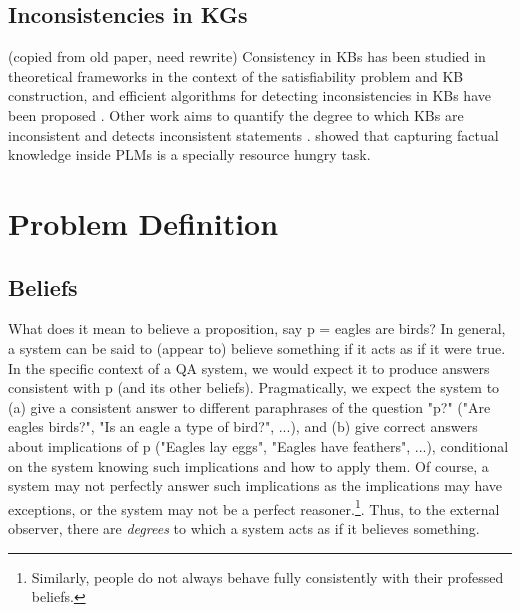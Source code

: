 \documentclass[11pt]{article}
\newcommand{\eat}[1]{}
\begin{document}
\eat{
\subsection{PLMs and KGs}
\subsection{Knowledge Graph Identification}
\citet{Pujara2013KnowledgeGI}
use probabilistic soft logic (PSL) \cite{Broecheler2010ProbabilisticSL}.
}

\subsection{Inconsistencies in KGs}
(copied from old paper, need rewrite)
Consistency in KBs has been
studied in theoretical frameworks in the context of the
satisfiability problem and KB construction, and efficient
algorithms for detecting inconsistencies in KBs have been
proposed \cite{hansen2000probabilistic,andersen2001easy}.
Other work aims to quantify the degree to which KBs are
inconsistent and detects inconsistent statements
\cite{Thimm:2009d,muino2011measuring,Thimm:2013}.
\cite{zhang2020need} showed that capturing factual knowledge inside PLMs is a specially resource hungry task.





\section{Problem Definition}

\subsection{Beliefs}

What does it mean to believe a proposition, say p = eagles are birds? In general, a system can
be said to (appear to) believe something if it acts as if it were true. In the specific
context of a QA system, we would expect it to produce answers consistent with p (and
its other beliefs). Pragmatically, we expect the system to (a) give a consistent answer to
different paraphrases of the question "p?" ("Are eagles birds?", "Is an eagle a type of bird?", ...),
and (b) give correct answers about implications of p ("Eagles lay eggs", "Eagles have feathers", ...),
conditional on the system knowing such implications and how to apply them.
Of course, a system may not perfectly answer such implications as the implications
may have exceptions, or the system may not be a perfect reasoner.\footnote{Similarly,
people do not always behave fully consistently with their professed beliefs.}.
Thus, to the external observer, there are {\it degrees} to which a system acts as if it
believes something.
\end{document}
